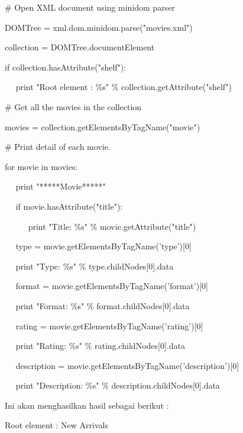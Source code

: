 \vspace{12pt}
\noindent 
 $  \#  $ Open XML document using minidom parser \par
\noindent 
DOMTree = xml.dom.minidom.parse("movies.xml") \par
\noindent 
collection = DOMTree.documentElement \par
\noindent 
if collection.hasAttribute("shelf"): \par
\noindent 
~~ print "Root element :  $  \%  $s"  $  \%  $ collection.getAttribute("shelf") \par
\vspace{12pt}
\noindent 
 $  \#  $ Get all the movies in the collection \par
\noindent 
movies = collection.getElementsByTagName("movie") \par
\vspace{12pt}
\noindent 
 $  \#  $ Print detail of each movie. \par
\noindent 
for movie in movies: \par
\noindent 
~~ print "*****Movie*****" \par
\noindent 
~~ if movie.hasAttribute("title"): \par
\noindent 
~~~~~ print "Title:  $  \%  $s"  $  \%  $ movie.getAttribute("title") \par
\vspace{12pt}
\noindent 
~~ type = movie.getElementsByTagName('type')[0] \par
\noindent 
~~ print "Type:  $  \%  $s"  $  \%  $ type.childNodes[0].data \par
\noindent 
~~ format = movie.getElementsByTagName('format')[0] \par
\noindent 
~~ print "Format:  $  \%  $s"  $  \%  $ format.childNodes[0].data \par
\noindent 
~~ rating = movie.getElementsByTagName('rating')[0] \par
\noindent 
~~ print "Rating:  $  \%  $s"  $  \%  $ rating.childNodes[0].data \par
\noindent 
~~ description = movie.getElementsByTagName('description')[0] \par
\noindent 
~~ print "Description:  $  \%  $s"  $  \%  $ description.childNodes[0].data \par
\vspace{12pt}
\noindent 
Ini akan menghasilkan hasil sebagai berikut : \par
\noindent 
Root element : New Arrivals \par
\noindent 
